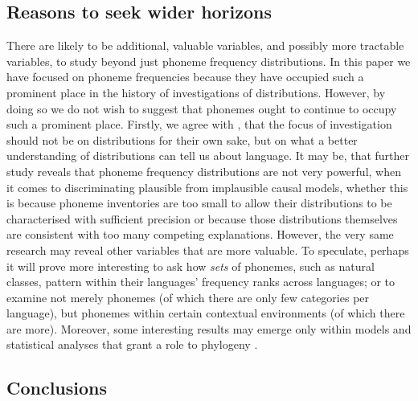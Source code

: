 \hypertarget{reasons-to-seek-wider-horizons}{%
\subsection{Reasons to seek wider horizons}\label{reasons-to-seek-wider-horizons}}

There are likely to be additional, valuable variables, and possibly more tractable variables, to study beyond just phoneme frequency distributions. In this paper we have focused on phoneme frequencies because they have occupied such a prominent place in the history of investigations of distributions. However, by doing so we do not wish to suggest that phonemes ought to continue to occupy such a prominent place. Firstly, we agree with \textcite{piantadosi2014zipf}, that the focus of investigation should not be on distributions for their own sake, but on what a better understanding of distributions can tell us about language. It may be, that further study reveals that phoneme frequency distributions are not very powerful, when it comes to discriminating plausible from implausible causal models, whether this is because phoneme inventories are too small to allow their distributions to be characterised with sufficient precision or because those distributions themselves are consistent with too many competing explanations. However, the very same research may reveal other variables that are more valuable. To speculate, perhaps it will prove more interesting to ask how \emph{sets} of phonemes, such as natural classes, pattern within their languages' frequency ranks across languages; or to examine not merely phonemes (of which there are only few categories per language), but phonemes within certain contextual environments (of which there are more). Moreover, some interesting results may emerge only within models and statistical analyses that grant a role to phylogeny \autocite{macklin-cordes_phylogenetic_2021}.

\hypertarget{phon-freq-conclusions}{%
\subsection{Conclusions}\label{phon-freq-conclusions}}

